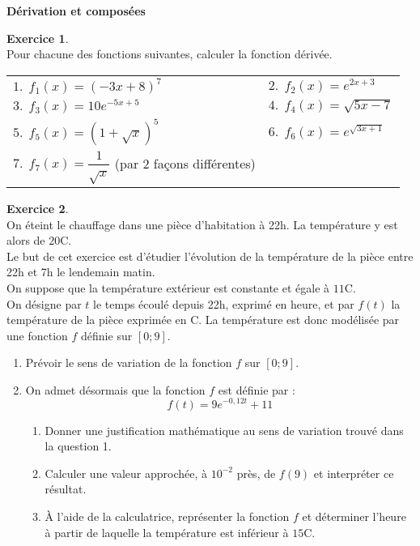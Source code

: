 \documentclass[twocolumn,10pt]{article}
\theoremstyle{definition}
\theoremstyle{definition}
\theoremstyle{definition}
\theoremstyle{definition}
\theoremstyle{definition}
\theoremstyle{definition}
\theoremstyle{definition}
\newtheorem{exercice}{Exercice}
\theoremstyle{definition}
\theoremstyle{definition}
\theoremstyle{definition}
\theoremstyle{definition}
\theoremstyle{definition}
\theoremstyle{definition}
\theoremstyle{definition}
\theoremstyle{definition}
\theoremstyle{definition}
\theoremstyle{definition}
\theoremstyle{definition}
\begin{document}
\begin{center}
\Large\textbf{Dérivation et composées}\normalsize
\end{center}


\begin{exercice}~\\
Pour chacune des fonctions suivantes, calculer la fonction dérivée.
\begin{center}
\begin{tabularx}{12cm}{XX}
$1.~~f_1(x)=(-3x+8)^7$ &$2.~~f_2(x)=e^{2x+3}$\\ 
$3.~~f_3(x)=10e^{-5x+5}$ &$4.~~f_4(x)=\sqrt{5x-7}$ \\
$5.~~f_5(x)=(1+\sqrt{x})^5$ &$6.~~f_6(x)=e^{\sqrt{3x+1}}$\\
$7.~~f_7(x)=\dfrac{1}{\sqrt{x}}$ (par 2 façons différentes)\\
\end{tabularx}
\end{center}
\end{exercice}

\begin{exercice}~\\
On éteint le chauffage dans une pièce d'habitation à 22h. La température y est alors de $20$\degre C. \\
Le but de cet exercice est d'étudier l'évolution de la température de la pièce entre 22h et 7h le lendemain matin. \\
On suppose que la température extérieur est constante et égale à $11$\degre C. \\
On désigne par $t$ le temps écoulé depuis 22h, exprimé en heure, et par $f(t)$ la température de la pièce exprimée en \degre C. La température est donc modélisée par une fonction $f$ définie sur $[0;9]$. 
\begin{enumerate}
\item Prévoir le sens de variation de la fonction $f$ sur $[0;9]$. 
\item On admet désormais que la fonction $f$ est définie par : $$f(t)=9e^{-0,12t}+11$$
			\begin{enumerate} 
			\item Donner une justification mathématique au sens de variation trouvé dans la question 1.
			\item Calculer une valeur approchée, à $10^{-2}$ près, de $f(9)$ et interpréter ce résultat. 
			\item À l'aide de la calculatrice, représenter la fonction $f$ et déterminer l'heure à partir de laquelle la température est inférieur à $15$\degre C. 
			\end{enumerate}
\end{enumerate}
\end{exercice}
\end{document}
